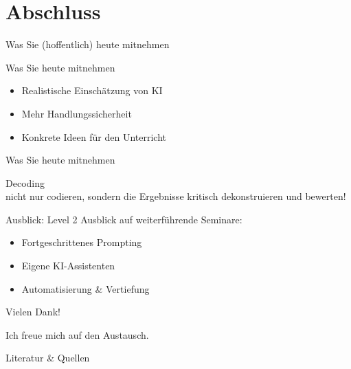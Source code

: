 \documentclass[14pt, aspectratio=169]{beamer}
\begin{document}

\section{Abschluss}

\begin{frame}{}
\begin{center}
    \Large Was Sie (hoffentlich) heute mitnehmen
\end{center}
\end{frame}

\begin{frame}{Was Sie heute mitnehmen}
\begin{itemize}
    \item Realistische Einschätzung von KI
    \item Mehr Handlungssicherheit
    \item Konkrete Ideen für den Unterricht
\end{itemize}
\end{frame}

\begin{frame}{Was Sie heute mitnehmen}
\begin{center}
    \Large Decoding\\
    \normalsize nicht nur codieren, sondern die Ergebnisse kritisch dekonstruieren und bewerten!
    \begin{tiny}
        \autocite{rahimi_ai_2025}
    \end{tiny}
\end{center}
\end{frame}

\begin{frame}{Ausblick: Level 2}
    \Large Ausblick auf weiterführende Seminare:
\begin{itemize}
    \item Fortgeschrittenes Prompting
    \item Eigene KI-Assistenten
    \item Automatisierung \& Vertiefung
\end{itemize}
\end{frame}

\begin{frame}{}
\begin{center}
    \Huge Vielen Dank!
    
    \vspace{0.5cm}
    \Large Ich freue mich auf den Austausch.
\end{center}
\end{frame}

\begin{frame}[allowframebreaks]{Literatur \& Quellen}
\printbibliography
\end{frame}
\end{document}
